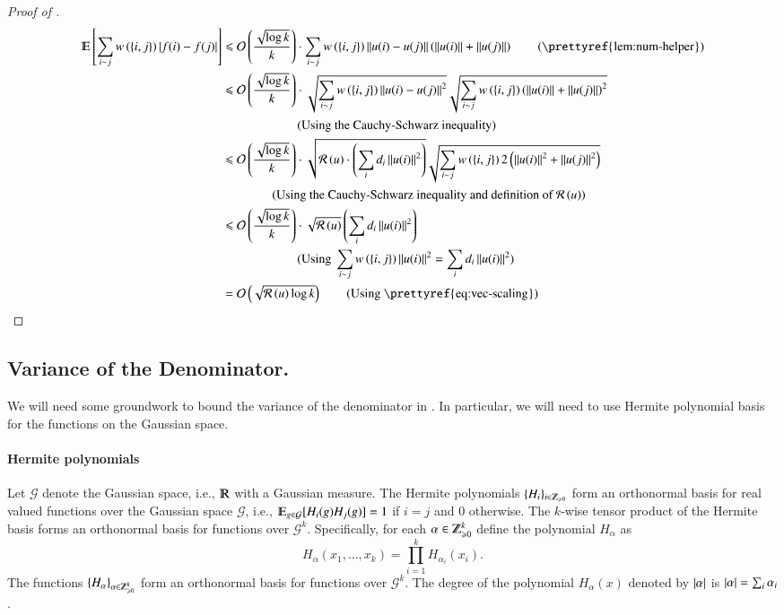 \documentclass[11pt]{article}
\newcommand{\ralsymb}{\cR}
\newcommand{\ral}[1]{\ralsymb\left(#1\right)} %
\begin{document}
\begin{proof}[Proof of ]
\begin{align*}
\Ex{\sum_{i \sim j} w \paren{\set{i,j}} \Abs{f(i) - f(j) }} 
& \leq \cO\left(\frac{ \sqrt{\log k}}{k} \right) \cdot  \sum_{i \sim j} w \paren{\set{i,j}} \norm{u(i) - u(j)}\paren{ \norm{u(i)} + \norm{u(j)} } 
		\qquad  \textrm{(\prettyref{lem:num-helper})} \\
& \leq \cO\left(\frac{ \sqrt{\log k}}{k} \right) \cdot \sqrt{ \sum_{i \sim j} w \paren{\set{i,j}} \norm{u(i) - u(j)}^2  }
			\sqrt{\sum_{i \sim j} w \paren{\set{i,j}} \paren{ \norm{u(i)} + \norm{u(j)} }^2  } \\
	& \qquad \qquad \qquad	  \textrm{(Using the Cauchy-Schwarz inequality)}  \\
& \leq \cO\left(\frac{ \sqrt{\log k}}{k} \right) \cdot \sqrt{ \ral{u} \cdot \paren{\sum_i d_i \norm{u(i)}^2}}	
			\sqrt{\sum_{i \sim j} w \paren{\set{i,j}} 2 \paren{ \norm{u(i)}^2 + \norm{u(j)}^2 } } \\
	& \qquad \qquad	  (\textrm{Using the Cauchy-Schwarz
	inequality and definition of } \ral{u})  \\
& \leq \cO\left(\frac{ \sqrt{\log k}}{k} \right) \cdot  \sqrt{ \ral{u}} \paren{\sum_i d_i \norm{u(i)}^2} \\
& \qquad \qquad \qquad 	  (\textrm{Using }\sum_{i \sim
j}w\paren{\set{i,j}}\norm{u(i)}^2 = \sum_{i} d_i \norm{u(i)}^2)  \\
& = \cO\left(\sqrt{\ral{u} \log k}\right) \qquad \textrm{(Using
	\prettyref{eq:vec-scaling})}
\end{align*}
\end{proof}
%


\subsection{Variance of the Denominator.}

We will need some groundwork to bound the variance of the denominator
in .  In particular, we will need to use
Hermite polynomial basis for the functions on the Gaussian space.	

\paragraph{Hermite polynomials}
Let $\mathcal{G}$ denote the Gaussian space, i.e., $\R$ with a Gaussian measure.
	The Hermite polynomials $\{H_i\}_{i \in \N}$ form an
	orthonormal basis for real valued functions over the Gaussian
	space $\mathcal{G}$, i.e., $\E_{g \in \mathcal{G}}[H_{i}(g)H_j(g)] = 1$ if $i
	= j$ and $0$ otherwise.  The $k$-wise tensor product of the
	Hermite basis forms an orthonormal basis for functions over
	$\mathcal{G}^k$.  Specifically, for each $\alpha \in \N^k$
	define the polynomial $H_{\alpha}$ as
	$$ H_{\alpha}(x_1,\ldots,x_k) = \prod_{i = 1}^k
	H_{\alpha_i}(x_i).$$
	The functions $\{H_\alpha\}_{\alpha \in \N^k}$ form an
	orthonormal basis for functions over $\mathcal{G}^k$.
	The degree of the polynomial $H_{\alpha}(x)$ denoted by
	$\left\lvert\alpha\right\rvert$ is $\left\lvert\alpha\right\rvert = \sum_{i} \alpha_i$.
\end{document}
